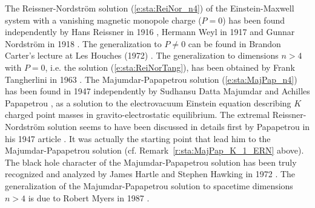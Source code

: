 \begin{hist}
The Reissner-Nordström solution (\ref{e:sta:ReiNor_n4})
of the Einstein-Maxwell system with a vanishing magnetic monopole charge ($P=0$) has been found independently by Hans Reissner
in 1916 \cite{Reiss1916}, Hermann Weyl in 1917 \cite{Weyl1917}
and Gunnar Nordström in 1918 \cite{Nords1918}.
The generalization to $P\neq 0$ can be found in Brandon Carter's
lecture at Les Houches (1972) \cite{Carte73a}.
The generalization to dimensions $n > 4$ with $P=0$, i.e. the solution (\ref{e:sta:ReiNorTang}),
has been obtained by Frank Tangherlini in 1963 \cite{Tangh63}.
The Majumdar-Papapetrou solution (\ref{e:sta:MajPap_n4}) has been found
in 1947 independently by Sudhansu Datta Majumdar \cite{Majum47}
and Achilles Papapetrou \cite{Papap47}, as a solution to the electrovacuum
Einstein equation describing $K$ charged point masses in gravito-electrostatic equilibrium.
The extremal Reissner-Nordström solution seems to have been discussed in details first
by Papapetrou in his 1947 article \cite{Papap47}. It was actually the starting point that lead
him to the Majumdar-Papapetrou solution (cf. Remark~\ref{r:sta:MajPap_K_1_ERN} above).
The black hole character of the Majumdar-Papapetrou solution has been truly recognized
and analyzed by James Hartle and Stephen Hawking
in 1972 \cite{HartlH72}. The generalization of the Majumdar-Papapetrou solution
to spacetime dimensions $n > 4$ is due to Robert Myers in 1987
\cite{Myers87}.
\end{hist}

